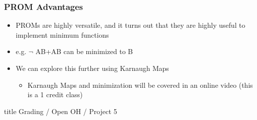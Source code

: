 \documentclass{beamer}
\begin{document}
             \begin{frame}
             	\frametitle{PROM Advantages}
             	\begin{itemize}
             		\item PROMs are highly versatile, and it turns out that they are highly useful to implement minimum functions
             		\item e.g. $\lnot$ AB+AB can be minimized to B
             		\item We can explore this further using Karnaugh Maps
             		\begin{itemize}
             			\item Karnaugh Maps and minimization will be covered in an online video (this is a 1 credit class)
             		\end{itemize}
             	\end{itemize}
             \end{frame}
             
   		\begin{frame}
                \vfill
                \centering
                \begin{beamercolorbox}[sep=8pt,center,shadow=true,rounded=true]{title}
                    Grading / Open OH / Project 5\par%
                \end{beamercolorbox}
                \vfill
             \end{frame}
   		
    
\end{document}
